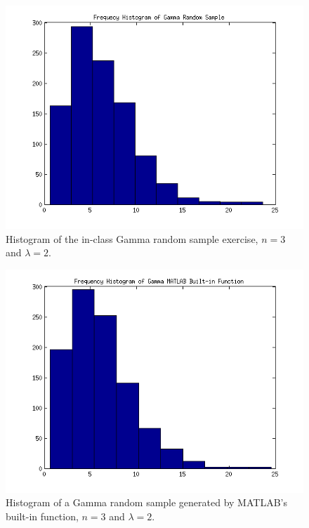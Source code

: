 \documentclass[12pt,a4paper]{article}
\begin{document}
\begin{figure}[ht!]
\begin{center}
\includegraphics[scale=.80]{inClass_hist.png}
\caption{Histogram of the in-class Gamma random sample exercise, $n=3$ and $\lambda=2$.}
\label{inclassfig2}
\end{center}
\end{figure}

\begin{figure}[ht!]
\begin{center}
\includegraphics[scale=.80]{inClass_MATLABhist.png}
\caption{Histogram of a Gamma random sample generated by MATLAB's built-in function, $n=3$ and $\lambda=2$.}
\label{inclassfig3}
\end{center}
\end{figure}
\end{document}
